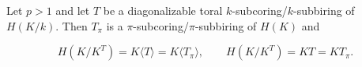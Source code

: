 Let $p > 1$ and let $T$ be a diagonalizable toral $k$-subcoring/$k$-subbiring of $H(K/k)$. Then $T_\pi$ is a $\pi$-subcoring/$\pi$-subbiring of $H(K)$ and

$$
H(K/K^T) = K\langle T \rangle = K\langle T_\pi \rangle, \qquad H(K/K^T) = KT = KT_\pi.
$$
